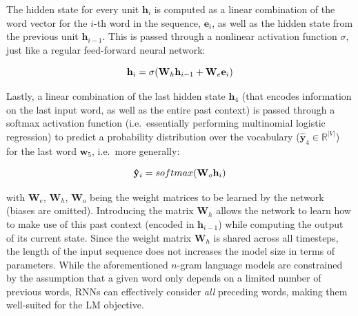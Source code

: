 \documentclass[12pt,a4paper,]{book}
\begin{document}
The hidden state for every unit \(\mathbf{h}_i\) is computed as a linear combination of the word vector for the \(i\)-th word in the sequence, \(\mathbf{e}_i\), as well as the hidden state from the previous unit \(\mathbf{h}_{i-1}\). This is passed through a nonlinear activation function \(\sigma\), just like a regular feed-forward neural network:

\begin{equation}
\mathbf{h}_i =  \sigma (\mathbf{W}_h \mathbf{h}_{i-1} + \mathbf{W}_e \mathbf{e}_{i}) \notag
\end{equation}

Lastly, a linear combination of the last hidden state \(\mathbf{h}_{4}\) (that encodes information on the last input word, as well as the entire past context) is passed through a softmax activation function \citep{goodfellow2016} (i.e.~essentially performing multinomial logistic regression) to predict a probability distribution over the vocabulary (\(\mathbf{\hat{y}}_4 \in \mathbb{R}^{|V|}\)) for the last word \(\mathbf{w}_5\), i.e.~more generally:

\begin{equation}
\mathbf{\hat{y}}_i =  softmax (\mathbf{W}_o \mathbf{h}_{i}) \notag
\end{equation}

with \(\mathbf{W}_e\), \(\mathbf{W}_h\), \(\mathbf{W}_o\) being the weight matrices to be learned by the network (biases are omitted). Introducing the matrix \(\mathbf{W}_h\) allows the network to learn how to make use of this past context (encoded in \(\mathbf{h}_{i-1}\)) while computing the output of its current state. Since the weight matrix \(\mathbf{W}_h\) is shared across all timesteps, the length of the input sequence does not increases the model size in terms of parameters. While the aforementioned \(n\)-gram language models are constrained by the assumption that a given word only depends on a limited number of previous words, RNNs can effectively consider \emph{all} preceding words, making them well-suited for the LM objective.
\end{document}
